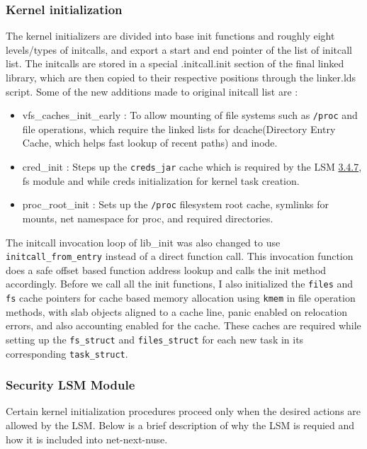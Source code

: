 \documentclass{sig-alternate}
\begin{document}
\subsubsection{Kernel initialization}
The kernel initializers are divided into base init functions and roughly eight levels/types of initcalls, and export a start and end pointer of the list of initcall list. 
The initcalls are stored in a special .initcall.init section of the final linked library, which are then copied to their respective positions through the linker.lds script.
Some of the new additions made to original initcall list are : 

\begin{itemize}
  \item vfs\_caches\_init\_early : To allow mounting of file systems such as \texttt{/proc} and file operations, which require the linked lists for 
  dcache(Directory Entry Cache, which helps fast lookup of recent paths) and inode.
  \item cred\_init : Steps up the \texttt{creds\_jar} cache which is required by the LSM \hyperref[Section_LSM]{3.4.7}, fs module and 
  while creds initialization for kernel task creation.
  \item proc\_root\_init : Sets up the \texttt{/proc} filesystem root cache, symlinks for mounts, net namespace for proc, and required directories.
\end{itemize}

The initcall invocation loop of lib\_init was also changed to use \texttt{initcall\_from\_entry} instead of a direct function call. 
This invocation function does a safe offset based function address lookup and calls the init method accordingly. 
Before we call all the init functions, I also initialized the \texttt{files} and \texttt{fs} cache pointers for cache based memory 
allocation using \texttt{kmem} in file operation methods, with slab objects aligned to a cache line, panic enabled on relocation errors, and also accounting enabled 
for the cache. These caches are required while setting up the \texttt{fs\_struct} and \texttt{files\_struct} for each new task in its 
corresponding \texttt{task\_struct}. 

\subsubsection{Security LSM Module}\label{Section_LSM}
Certain kernel initialization procedures proceed only when the desired actions are allowed by the LSM. Below is a brief description of why the LSM is requied and how 
it is included into net-next-nuse.
\end{document}
